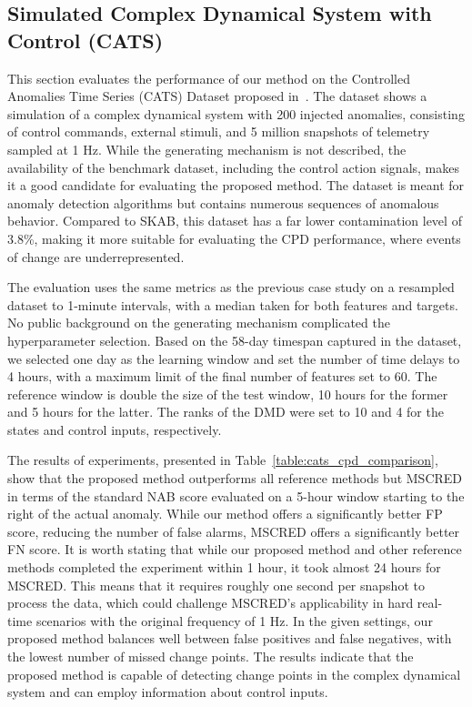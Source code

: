 \subsection{Simulated Complex Dynamical System with Control (CATS)}
This section evaluates the performance of our method on the Controlled Anomalies Time Series (CATS) Dataset proposed in~\cite{Fleith2023}. The dataset shows a simulation of a complex dynamical system with 200 injected anomalies, consisting of control commands, external stimuli, and 5 million snapshots of telemetry sampled at 1 Hz. While the generating mechanism is not described, the availability of the benchmark dataset, including the control action signals, makes it a good candidate for evaluating the proposed method. The dataset is meant for anomaly detection algorithms but contains numerous sequences of anomalous behavior. Compared to SKAB, this dataset has a far lower contamination level of 3.8\%, making it more suitable for evaluating the CPD performance, where events of change are underrepresented.

The evaluation uses the same metrics as the previous case study on a resampled dataset to 1-minute intervals, with a median taken for both features and targets. No public background on the generating mechanism complicated the hyperparameter selection. Based on the 58-day timespan captured in the dataset, we selected one day as the learning window and set the number of time delays to 4 hours, with a maximum limit of the final number of features set to 60. The reference window is double the size of the test window, 10 hours for the former and 5 hours for the latter. The ranks of the DMD were set to 10 and 4 for the states and control inputs, respectively.

The results of experiments, presented in Table~\ref{table:cats_cpd_comparison}, show that the proposed method outperforms all reference methods but MSCRED in terms of the standard NAB score evaluated on a 5-hour window starting to the right of the actual anomaly. While our method offers a significantly better FP score, reducing the number of false alarms, MSCRED offers a significantly better FN score. It is worth stating that while our proposed method and other reference methods completed the experiment within 1 hour, it took almost 24 hours for MSCRED\@. This means that it requires roughly one second per snapshot to process the data, which could challenge MSCRED's applicability in hard real-time scenarios with the original frequency of 1 Hz. In the given settings, our proposed method balances well between false positives and false negatives, with the lowest number of missed change points. The results indicate that the proposed method is capable of detecting change points in the complex dynamical system and can employ information about control inputs.

